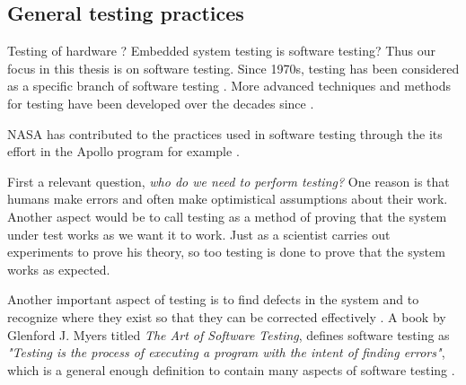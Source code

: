 \documentclass[english,12pt,a4paper,pdftex,elec,utf8]{aaltothesis}
\begin{document}
\subsection{General testing practices}
Testing of hardware ? Embedded system testing is software testing? Thus our focus in this thesis is on software testing.
Since 1970s, testing has been considered as a specific branch of software testing \cite{artofsofttesting, compinspace}. More advanced techniques and methods for testing have been developed over the decades since \cite{artofsofttesting}.\par
NASA has contributed to the practices used in software testing through the its effort in the Apollo program for example \cite{compinspace}. \par
First a relevant question, \textit{who do we need to perform testing?} One reason is that humans make errors and often make optimistical assumptions about their work. Another aspect would be to call testing as a method of proving that the system under test works as we want it to work. Just as  a scientist carries out experiments to prove his theory, so too testing is done to prove that the system works as expected. \cite{testingcomplex}\par
Another important aspect of testing is to find defects in the system and to recognize where they exist so that they can be corrected effectively \cite{sularikurssi, artofsofttesting}. A book by Glenford J. Myers titled \textit{The Art of Software Testing}, defines software testing as \textit{"Testing is the process of executing a program with the intent of finding errors"}, which is a general enough definition to contain many aspects of software testing \cite{artofsofttesting}.
\end{document}
